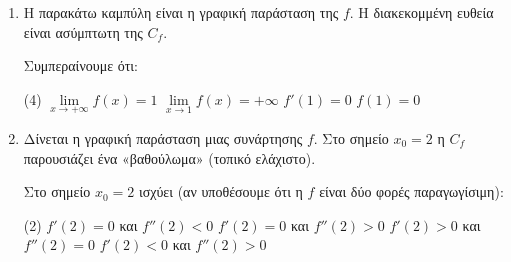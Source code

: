 \begin{enumerate}[label=\textbf{2.\arabic*.}, itemsep=4mm]
    \item Η παρακάτω καμπύλη είναι η γραφική παράσταση της $f$. Η διακεκομμένη ευθεία είναι ασύμπτωτη της $C_f$.
    \begin{center}
    \end{center}
    Συμπεραίνουμε ότι:
    \begin{tasks}[label=\let\textdexiakeraia\relax\alph*.](4)
        \task $\lim\limits_{x \to +\infty} f(x) = 1$
        \task $\lim\limits_{x \to 1} f(x) = +\infty$
        \task $f'(1) = 0$
        \task $f(1) = 0$
    \end{tasks}

    \item Δίνεται η γραφική παράσταση μιας συνάρτησης $f$. Στο σημείο $x_0 = 2$ η $C_f$ παρουσιάζει ένα «βαθούλωμα» (τοπικό ελάχιστο).
    \begin{center}
    \end{center}
    Στο σημείο $x_0 = 2$ ισχύει (αν υποθέσουμε ότι η $f$ είναι δύο φορές παραγωγίσιμη):
    \begin{tasks}[label=\let\textdexiakeraia\relax\alph*.](2)
        \task $f'(2) = 0$ και $f''(2) < 0$
        \task $f'(2) = 0$ και $f''(2) > 0$
        \task $f'(2) > 0$ και $f''(2) = 0$
        \task $f'(2) < 0$ και $f''(2) > 0$
    \end{tasks}

\end{enumerate}

\vspace{0.5cm}
